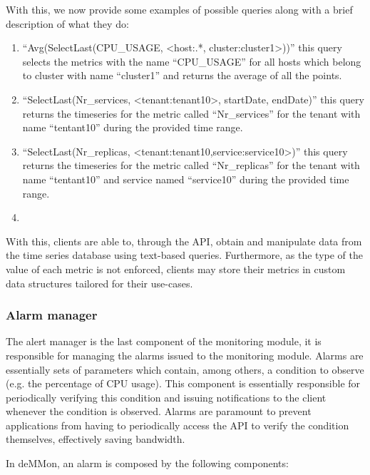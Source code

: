  With this, we now provide some examples of possible queries along with a brief description of what they do:

\begin{enumerate}
    \item ``Avg(SelectLast(CPU\_USAGE, <host:.*, cluster:cluster1>))'' this query selects the metrics with the name ``CPU\_USAGE'' for all hosts which belong to cluster with name ``cluster1'' and returns the average of all the points.
    
    \item ``SelectLast(Nr\_services, <tenant:tenant10>, startDate, endDate)'' this query returns the timeseries for the metric called ``Nr\_services'' for the tenant with name ``tentant10'' during the provided time range.

    \item ``SelectLast(Nr\_replicas, <tenant:tenant10,service:service10>)'' this query returns the timeseries for the metric called ``Nr\_replicas'' for the tenant with name ``tentant10'' and service named ``service10'' during the provided time range.
    
    \item {}
    
\end{enumerate}

With this, clients are able to, through the API, obtain and manipulate data from the time series database using text-based queries. Furthermore, as the type of the value of each metric is not enforced, clients may store their metrics in custom data structures tailored for their use-cases.

\subsubsection{Alarm manager}

The alert manager is the last component of the monitoring module, it is responsible for managing the alarms issued to the monitoring module. Alarms are essentially sets of parameters which contain, among others, a condition to observe (e.g. the percentage of CPU usage). This component is essentially responsible for periodically verifying this condition and issuing notifications to the client whenever the condition is observed. Alarms are paramount to prevent applications from having to periodically access the API to verify the condition themselves, effectively saving bandwidth.

In deMMon, an alarm is composed by the following components: 

